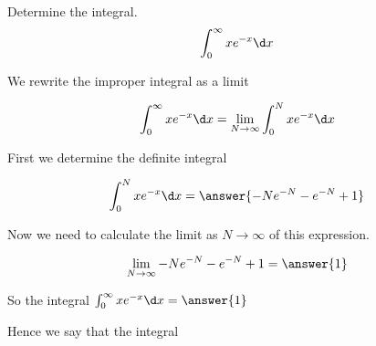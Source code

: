 \documentclass{ximera}
\author{Jason Miller}
\begin{document}
\begin{exercise}
Determine the integral.
\[
\int_{0}^{\infty} xe^{-x} \d x
\]


We rewrite the improper integral as a limit 

\[
\int_{0}^{\infty} xe^{-x} \d x= \lim_{N \to \infty} \int_{0}^{N} xe^{-x} \d x
\]


First we determine the definite integral

\[
\int_{0}^{N} xe^{-x} \d x=\answer{ -Ne^{-N}-e^{-N} +1 } 
\]




\begin{exercise}
Now we need to calculate the limit as $N \to \infty$ of this expression. 

\[
\lim_{N \to \infty}  -Ne^{-N}-e^{-N} +1 =\answer{ 1}
\]

\begin{exercise}
So the  integral $\int_{0}^{\infty} xe^{-x} \d x=\answer{1}$

\begin{exercise}
 Hence we say that the integral 

\begin{multipleChoice}
\end{multipleChoice}



\end{exercise}
\end{exercise}
\end{exercise}
\end{exercise}
\end{document}

